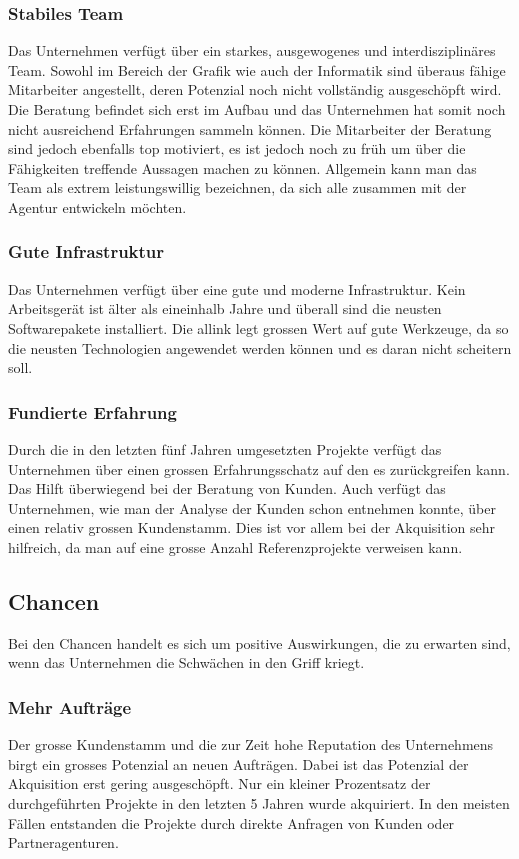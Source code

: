 \subsubsection{Stabiles Team}
Das Unternehmen verfügt über ein starkes, ausgewogenes und interdisziplinäres Team. 
Sowohl im Bereich der Grafik wie auch der Informatik sind überaus fähige Mitarbeiter 
angestellt, deren Potenzial noch nicht vollständig ausgeschöpft wird. Die Beratung
befindet sich erst im Aufbau und das Unternehmen hat somit noch nicht ausreichend
Erfahrungen sammeln können. Die Mitarbeiter der Beratung sind jedoch ebenfalls
top motiviert, es ist jedoch noch zu früh um über die Fähigkeiten treffende
Aussagen machen zu können. Allgemein kann man das Team als extrem leistungswillig
bezeichnen, da sich alle zusammen mit der Agentur entwickeln möchten.

\subsubsection{Gute Infrastruktur}
Das Unternehmen verfügt über eine gute und moderne Infrastruktur. Kein Arbeitsgerät
ist älter als eineinhalb Jahre und überall sind die neusten Softwarepakete installiert.
Die allink legt grossen Wert auf gute Werkzeuge, da so die neusten Technologien
angewendet werden können und es daran nicht scheitern soll.

\subsubsection{Fundierte Erfahrung}
Durch die in den letzten fünf Jahren umgesetzten Projekte verfügt das Unternehmen
über einen grossen Erfahrungsschatz auf den es zurückgreifen kann. Das Hilft
überwiegend bei der Beratung von Kunden.
Auch verfügt das Unternehmen, wie man der Analyse der Kunden schon entnehmen
konnte, über einen relativ grossen Kundenstamm. Dies ist vor allem bei der
Akquisition sehr hilfreich, da man auf eine grosse Anzahl Referenzprojekte 
verweisen kann.

\subsection{Chancen}
Bei den Chancen handelt es sich um positive Auswirkungen, die zu erwarten sind,
wenn das Unternehmen die Schwächen in den Griff kriegt.

\subsubsection{Mehr Aufträge}
Der grosse Kundenstamm und die zur Zeit hohe Reputation des Unternehmens
birgt ein grosses Potenzial an neuen Aufträgen. Dabei ist das Potenzial der
Akquisition erst gering ausgeschöpft. Nur ein kleiner Prozentsatz der durchgeführten
Projekte in den letzten 5 Jahren wurde akquiriert. In den meisten Fällen entstanden
die Projekte durch direkte Anfragen von Kunden oder Partneragenturen.


